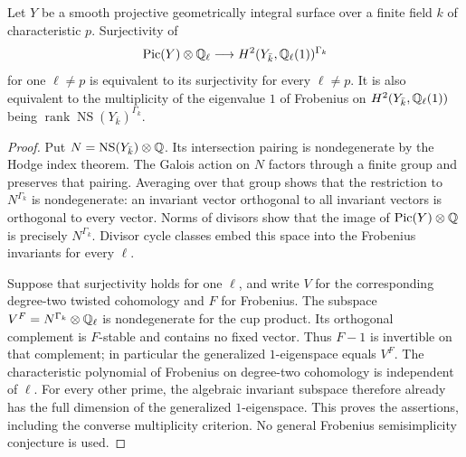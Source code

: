 \begin{lemma}
\label{lem:B-surface-Tate-prime}
Let \(Y\) be a smooth projective geometrically integral surface over a
finite field \(k\) of characteristic \(p\).  Surjectivity of
\[
 \operatorname{Pic}(Y)\otimes\mathbb Q_\ell\longrightarrow
 H^2(Y_{\bar k},\mathbb Q_\ell(1))^{\Gamma_k}
\]
for one \(\ell\ne p\) is equivalent to its surjectivity for every
\(\ell\ne p\).  It is also equivalent to the multiplicity of the
eigenvalue \(1\) of Frobenius on \(H^2(Y_{\bar k},\mathbb Q_\ell(1))\)
being \(\operatorname{rank}\operatorname{NS}(Y_{\bar k})^{\Gamma_k}\).
\end{lemma}

\begin{proof}
Put \(N=\operatorname{NS}(Y_{\bar k})\otimes\mathbb Q\).  Its intersection
pairing is nondegenerate by the Hodge index theorem.  The Galois action
on \(N\) factors through a finite group and preserves that pairing.
Averaging over that group shows that the restriction to \(N^{\Gamma_k}\)
is nondegenerate: an invariant vector orthogonal to all invariant
vectors is orthogonal to every vector.  Norms of divisors show that
the image of \(\operatorname{Pic}(Y)\otimes\mathbb Q\) is precisely
\(N^{\Gamma_k}\).  Divisor cycle classes embed this space into the
Frobenius invariants for every \(\ell\).

Suppose that surjectivity holds for one \(\ell\), and write \(V\) for
the corresponding degree-two twisted cohomology and \(F\) for
Frobenius.  The subspace \(V^F=N^{\Gamma_k}\otimes\mathbb Q_\ell\) is
nondegenerate for the cup product.  Its orthogonal complement is
\(F\)-stable and contains no fixed vector.  Thus \(F-1\) is invertible
on that complement; in particular the generalized \(1\)-eigenspace
equals \(V^F\).  The characteristic polynomial of Frobenius on
degree-two cohomology is independent of \(\ell\).  For every other
prime, the algebraic invariant subspace therefore already has the
full dimension of the generalized \(1\)-eigenspace.  This proves the
assertions, including the converse multiplicity criterion.  No
general Frobenius semisimplicity conjecture is used.
\end{proof}

